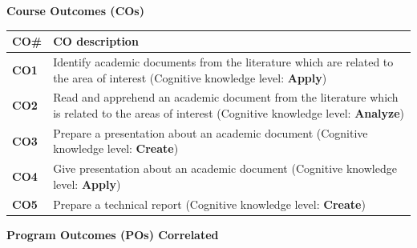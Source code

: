 \documentclass[12pt,a4paper]{report}
\begin{document}


 

\newpage

\begin{center}
    \textbf{\LARGE Course Outcomes (COs)}
\end{center}
\vspace{1cm}

\renewcommand{\arraystretch}{1.0}

\begin{table}[h]
\centering
\begin{tabular}{|l|p{12cm}|}
\hline
\rowcolor[HTML]{C0C0C0}
\textbf{CO\#} & \textbf{CO description} \\ \hline

\textbf{CO1} & Identify academic documents from the literature which are related to the area of interest (Cognitive knowledge level: \textbf{Apply}) \\ \hline

\textbf{CO2} & Read and apprehend an academic document from the literature which is related to the areas of interest (Cognitive knowledge level: \textbf{Analyze}) \\ \hline

\textbf{CO3} & Prepare a presentation about an academic document (Cognitive knowledge level: \textbf{Create}) \\ \hline

\textbf{CO4} & Give presentation about an academic document (Cognitive knowledge level: \textbf{Apply}) \\ \hline

\textbf{CO5} & Prepare a technical report (Cognitive knowledge level: \textbf{Create}) \\ \hline
\end{tabular}
\end{table}

\vspace{1.5em}

\begin{center}
    \textbf{\large Program Outcomes (POs) Correlated}
\end{center}
\end{document}
